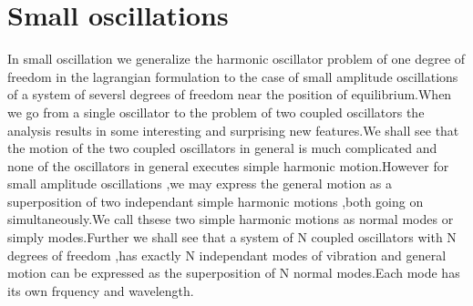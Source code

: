 \section{Small oscillations}
In small oscillation we generalize the harmonic oscillator problem of one degree of freedom in the lagrangian formulation to the case of small amplitude oscillations of a system of seversl degrees of freedom near the position of equilibrium.When we go from a single oscillator to the problem of two coupled oscillators the analysis results in some interesting and surprising new features.We shall see that the motion of the two coupled oscillators in general is much complicated and none of the oscillators in general executes simple harmonic motion.However for small amplitude oscillations ,we may express the general motion as a superposition of two independant simple harmonic motions ,both going on simultaneously.We call thsese two simple harmonic motions as normal modes or simply modes.Further we shall see that a system of N coupled oscillators with N degrees of freedom ,has exactly N independant modes of vibration and general motion can be expressed as the superposition of N normal modes.Each mode has its own frquency and wavelength.
